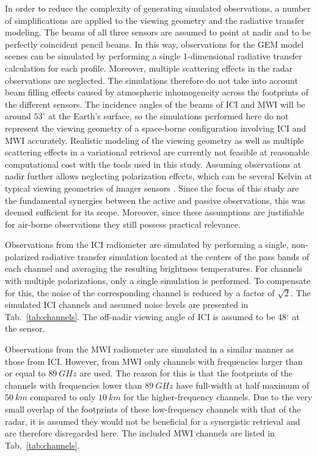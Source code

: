 \documentclass[journal abbreviation, manuscript]{copernicus}
\begin{document}
In order to reduce the complexity of generating simulated observations, a number
of simplifications are applied to the viewing geometry and the radiative
transfer modeling. The beams of all three sensors are assumed to point at nadir
and to be perfectly coincident pencil beams. In this way, observations for the
GEM model scenes can be simulated by performing a single 1-dimensional radiative
transfer calculation for each profile. Moreover, multiple scattering effects in
the radar observations are neglected. The simulations therefore do not take into
account beam filling effects caused by atmospheric inhomogeneity across the
footprints of the different sensors. The incidence angles of the beams of ICI
and MWI will be around $53^\circ$ at the Earth's surface, so the simulations
performed here do not represent the viewing geometry of a space-borne
configuration involving ICI and MWI accurately. Realistic modeling of the
viewing geometry as well as multiple scattering effects in a variational
retrieval are currently not feasible at reasonable computational cost with the
tools used in this study. Assuming observations at nadir further allows neglecting
polarization effects, which can be several Kelvin at typical viewing geometries
of imager sensors \cite{xie15}. Since the focus of this study are the fundamental
synergies between the active and passive observations, this was deemed
sufficient for its scope. Moreover, since these assumptions are justifiable for
air-borne observations they still possess practical relevance.

Observations from the ICI radiometer are simulated by performing a single,
non-polarized radiative transfer simulation located at the centers of the pass
bands of each channel and averaging the resulting brightness temperatures. For
channels with multiple polarizations, only a single simulation is performed.
To compensate for this, the noise of the corresponding channel is reduced by a
factor of $\sqrt{2}$. The simulated ICI channels and assumed noise levels are
presented in  Tab.~\ref{tab:channels}. The off-nadir viewing angle of ICI
is assumed to be $48\unit{^\circ}$ at the sensor.

Observations from the MWI radiometer are simulated in a similar manner as those
from ICI. However, from MWI only channels with frequencies larger than or equal
to $89\ \unit{GHz}$ are used. The reason for this is that the footprints of the
channels with frequencies lower than $89\ \unit{GHz}$ have full-width at half
maximum of $50\ \unit{km}$ compared to only $10\ \unit{km}$ for the
higher-frequency channels. Due to the very small overlap of the footprints of
these low-frequency channels with that of the radar, it is assumed they would
not be beneficial for a synergistic retrieval and are therefore disregarded
here. The included MWI channels are listed in Tab.~\ref{tab:channels}.
\end{document}
